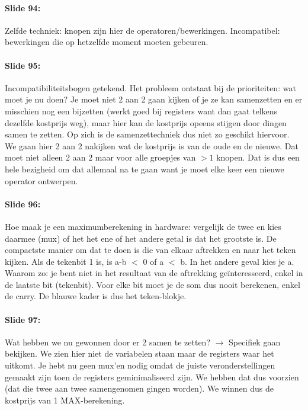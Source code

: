\documentclass[10pt,a4paper]{book}
\begin{document}
\paragraph{Slide 94:} Zelfde techniek: knopen zijn hier de operatoren/bewerkingen. Incompatibel: bewerkingen die op hetzelfde moment moeten gebeuren.

\paragraph{Slide 95:} Incompatibiliteitsbogen getekend. Het probleem ontstaat bij de prioriteiten: wat moet je nu doen? Je moet niet 2 aan 2 gaan kijken of je ze kan samenzetten en er misschien nog een bijzetten (werkt goed bij registers want dan gaat telkens dezelfde kostprijs weg), maar hier kan de kostprijs opeens stijgen door dingen samen te zetten. Op zich is de samenzettechniek dus niet zo geschikt hiervoor.\\
We gaan hier 2 aan 2 nakijken wat de kostprijs is van de oude en de nieuwe. Dat moet niet alleen 2 aan 2 maar voor alle groepjes van $>1$ knopen. Dat is dus een hele bezigheid om dat allemaal na te gaan want je moet elke keer een nieuwe operator ontwerpen.

\paragraph{Slide 96:} Hoe maak je een maximumberekening in hardware: vergelijk de twee en kies daarmee (mux) of het het ene of het andere getal is dat het grootste is. De compactste manier om dat te doen is die van elkaar aftrekken en naar het teken kijken. Als de tekenbit 1 is, is a-b $<$ 0 of a $<$ b. In het andere geval kies je a. Waarom zo: je bent niet in het resultaat van de aftrekking ge\"interesseerd, enkel in de laatste bit (tekenbit). Voor elke bit moet je de som dus nooit berekenen, enkel de carry. De blauwe kader is dus het teken-blokje. 

\paragraph{Slide 97:} Wat hebben we nu gewonnen door er 2 samen te zetten? $\rightarrow$ Specifiek gaan bekijken. We zien hier niet de variabelen staan maar de registers waar het uitkomt. Je hebt nu geen mux'en nodig omdat de juiste veronderstellingen gemaakt zijn toen de registers geminimaliseerd zijn. We hebben dat dus voorzien (dat die twee aan twee samengenomen gingen worden). We winnen dus de kostprijs van 1 MAX-berekening.
\end{document}
